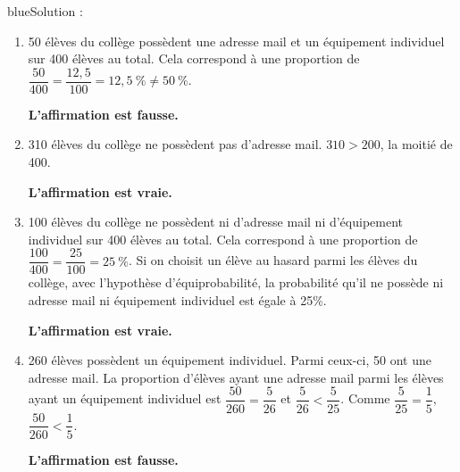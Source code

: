 \begin{color}{blue}Solution :\par

\begin{enumerate}
\item
50 élèves du collège possèdent une adresse mail et un équipement individuel sur 400 élèves au total. Cela correspond à une proportion de $\dfrac{50}{400} = \dfrac{12,5}{100} = 12,5~\% \neq 50~\% $.

\textbf{L'affirmation est fausse.}

\item 
310 élèves du collège ne possèdent pas d'adresse mail. $310>200$, la moitié de 400.

\textbf{L'affirmation est vraie.}
\item 

100 élèves du collège ne possèdent ni d'adresse mail ni d'équipement individuel sur 400 élèves au total. Cela correspond à une proportion de $\dfrac{100}{400} = \dfrac{25}{100} = 25~\% $. Si on choisit un élève au hasard parmi les élèves du collège, avec l'hypothèse d'équiprobabilité, la probabilité qu'il ne possède ni adresse mail ni équipement individuel est égale à 25\%.

\textbf{L'affirmation est vraie.}
\item 

260 élèves possèdent un équipement individuel. Parmi ceux-ci, 50 ont une adresse mail. La proportion d'élèves ayant une adresse mail parmi les élèves ayant un équipement individuel est $\dfrac{50}{260}=\dfrac{5}{26}$ et $\dfrac{5}{26}<\dfrac{5}{25}$. Comme $\dfrac{5}{25}=\dfrac{1}{5}$, $\dfrac{50}{260}<\dfrac{1}{5}$.

\textbf{L'affirmation est fausse.}

\end{enumerate}

\end{color}
